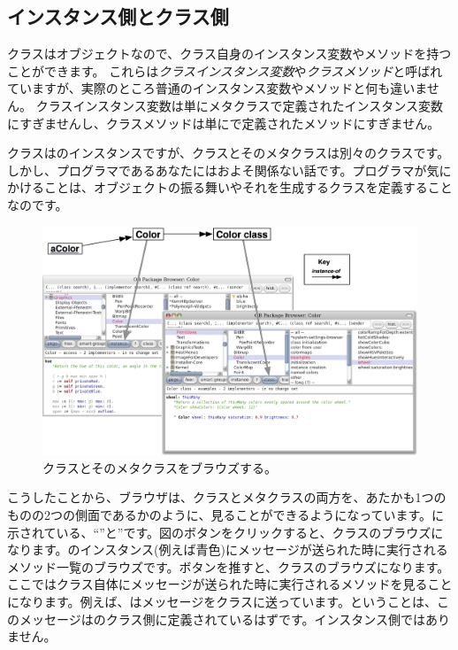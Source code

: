 \documentclass[a4paper,10pt,twoside]{book}
\begin{document}
\subsection{インスタンス側とクラス側}

クラスはオブジェクトなので、クラス自身のインスタンス変数やメソッドを持つことができます。
これらは\emph{クラスインスタンス変数}や\emph{クラスメソッド}と呼ばれていますが、実際のところ普通のインスタンス変数やメソッドと何も違いません。
クラスインスタンス変数は単にメタクラスで定義されたインスタンス変数にすぎませんし、クラスメソッドは単にで定義されたメソッドにすぎません。

クラスはのインスタンスですが、クラスとそのメタクラスは別々のクラスです。
しかし、プログラマであるあなたにはおよそ関係ない話です。プログラマが気にかけることは、オブジェクトの振る舞いやそれを生成するクラスを定義することなのです。

\begin{figure}[htb]
\begin{center}
\includegraphics[width=\textwidth]{Color-Buttons}
\caption{クラスとそのメタクラスをブラウズする。
}
\end{center}
\end{figure}

こうしたことから、ブラウザは、クラスとメタクラスの両方を、あたかも1つのものの2つの側面であるかのように、見ることができるようになっています。に示されている、``''と''です。図のボタンをクリックすると、クラスのブラウズになります。のインスタンス(例えば青色)にメッセージが送られた時に実行されるメソッド一覧のブラウズです。ボタンを推すと、クラスのブラウズになります。ここではクラス自体にメッセージが送られた時に実行されるメソッドを見ることになります。例えば、はメッセージをクラスに送っています。ということは、このメッセージはのクラス側に定義されているはずです。インスタンス側ではありません。
\end{document}
